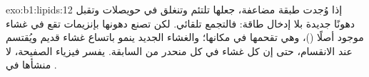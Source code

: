 \begin{solution}{exo:b1:lipids:12}
إذا وُجدت طبقة مضاعفة، جعلها  تلتئم وتنغلق في
حويصلات وتقبل دهونًا جديدة بلا إدخال طاقة: فالتجمع تلقائي. لكن
 تصنع دهونها بإنزيمات تقع في غشاء موجود أصلًا ()، وهي تقحمها في مكانها؛ والغشاء الجديد ينمو باتساع
غشاء قديم ويُقتسم عند الانقسام، حتى إن كل غشاء في كل  منحدر من
  السابقة.  يفسر فيزياء الصفيحة، لا منشأها
في .
\end{solution}

